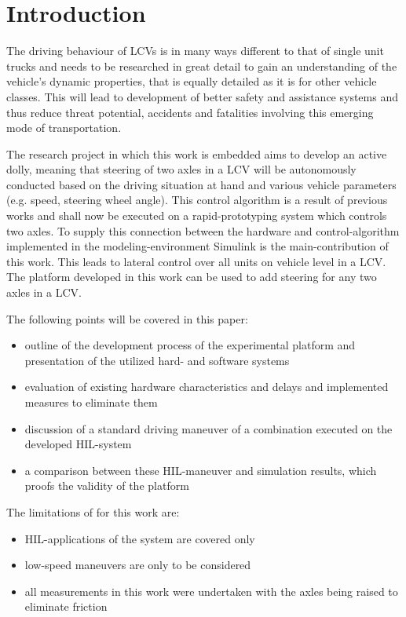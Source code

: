 \documentclass[root.tex]{subfiles}
\begin{document}
{\pagestyle{empty}}
\section{Introduction}
\label{chap:introduction}
\glsresetall
The driving behaviour of \glspl{LCV} is in many ways different to that of single unit trucks and needs to be researched in great detail to gain an understanding of the vehicle's dynamic properties, that is equally detailed as it is for other vehicle classes. This will lead to development of better safety and assistance systems and thus reduce threat potential, accidents and fatalities involving this emerging mode of transportation.\cite{performance_improvement}

The research project in which this work is embedded aims to develop an active dolly\cite{islam2015inverse, islam2015improve}, meaning that steering of two axles in a \gls{LCV} will be autonomously conducted based on the driving situation at hand and various vehicle parameters (e.g. speed, steering wheel angle). 
This control algorithm is a result of previous works and shall now be executed on a rapid-prototyping system which controls two axles. To supply this connection between the hardware and control-algorithm implemented in the modeling-environment Simulink is the main-contribution of this work. This leads to lateral control over all units on vehicle level in a \gls{LCV}. The platform developed in this work can be used to add steering for any two axles in a \gls{LCV}.



The following points will be covered in this paper:
\begin{itemize}
	\item outline of the development process of the experimental platform and presentation of the utilized hard- and software systems 
	\item evaluation of existing hardware characteristics and delays and implemented measures to eliminate them
	\item discussion of a standard driving maneuver of a combination executed on the  developed \gls{HIL}-system 
	\item a comparison between these \gls{HIL}-maneuver and simulation results, which proofs the validity of the platform
	
\end{itemize}

The limitations of for this work are: 

\begin{itemize}
	\item \gls{HIL}-applications of the system are covered only
	\item low-speed maneuvers are only to be considered
	\item all measurements in this work were undertaken with the axles being raised to eliminate friction
\end{itemize}
\end{document}

